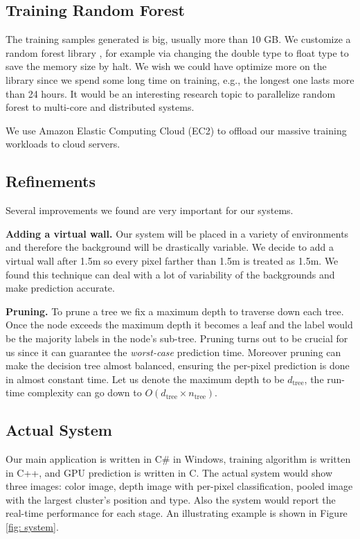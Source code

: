 \subsection{Training Random Forest}

The training samples generated is big, usually more than 10 GB. We customize a random forest library \cite{alglib}, for example via changing the double type to float type to save the memory size by halt. We wish we could have optimize more on the library since we spend some long time on training, e.g., the longest one lasts more than 24 hours. It would be an interesting research topic to parallelize random forest to multi-core and distributed systems.     

We use Amazon Elastic Computing Cloud (EC2) to offload our massive training workloads to cloud servers.  

\subsection{Refinements}
\label{sec:refinement}

Several improvements we found are very important for our systems.

\textbf{Adding a virtual wall.} Our system will be placed in a variety of environments and therefore the background will be drastically variable. We decide to add a virtual wall after 1.5m so every pixel farther than 1.5m is treated as 1.5m. We found this technique can deal with a lot of variability of the backgrounds and make prediction accurate. 

\textbf{Pruning.} To prune a tree we fix a maximum depth to traverse down each tree. Once the node exceeds the maximum depth it becomes a leaf and the label would be the majority labels in the node's sub-tree. Pruning turns out to be crucial for us since it can guarantee the \textit{worst-case} prediction time. Moreover pruning can make the decision tree almost balanced, ensuring the per-pixel prediction is done in almost constant time. Let us denote the maximum depth to be $d_{\text{tree}}$, the run-time complexity can go down to $O(d_{\text{tree}}\times n_{\text{tree}})$.


\subsection{Actual System}

Our main application is written in C\# in Windows, training algorithm is written in C++, and GPU prediction is written in C. The actual system would show three images: color image, depth image with per-pixel classification, pooled image with the largest cluster's position and type. Also the system would report the real-time performance for each stage. An illustrating example is shown in Figure \ref{fig: system}.


